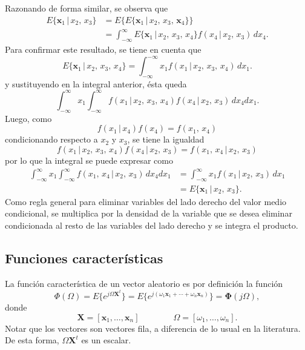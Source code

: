 \documentclass[a4paper]{report}
\newcommand{\X}{\mathbf{X}}
\newcommand{\x}{\mathbf{x}}
\newcommand{\Phibf}{\mathbf{\Phi}}
\begin{document}
Razonando de forma similar, se observa que
\begin{align*}
 E\{\x_1\,|\,x_2,\,x_3\}&=E\{E\{\x_1\,|\,x_2,\,x_3,\,\x_4\}\}\\
   &=\int_{-\infty}^{\infty}E\{\x_1\,|\,x_2,\,x_3,\,x_4\}f(x_4\,|\,x_2,\,x_3)\,dx_4.
\end{align*}
Para confirmar este resultado, se tiene en cuenta que
\[
 E\{\x_1\,|\,x_2,\,x_3,\,x_4\}=\int_{-\infty}^{-\infty}x_1f(x_1\,|\,x_2,\,x_3,\,x_4)\,dx_1.
\]
y sustituyendo en la integral anterior, ésta queda
\[
 \int_{-\infty}^{\infty}x_1\int_{-\infty}^{\infty}f(x_1\,|\,x_2,\,x_3,\,x_4)f(x_4\,|\,x_2,\,x_3)\,dx_4dx_1.
\]
Luego, como
\[
 f(x_1\,|\,x_4)f(x_4)=f(x_1,\,x_4)
\]
condicionando respecto a \(x_2\) y \(x_3\), se tiene la igualdad
\[
 f(x_1\,|\,x_2,\,x_3,\,x_4)f(x_4\,|\,x_2,\,x_3)=f(x_1,\,x_4\,|\,x_2,\,x_3)
\]
por lo que la integral se puede expresar como
\begin{align*}
 \int_{-\infty}^{\infty}x_1\int_{-\infty}^{\infty}f(x_1,\,x_4\,|\,x_2,\,x_3)\,dx_4dx_1&=\int_{-\infty}^{\infty}x_1f(x_1\,|\,x_2,\,x_3)\,dx_1\\
   &=E\{\x_1\,|\,x_2,\,x_3\}.
\end{align*}
Como regla general para eliminar variables del lado derecho del valor medio condicional, se multiplica por la densidad de la variable que se desea eliminar condicionada al resto de las variables del lado derecho y se integra el producto.

\subsection{Funciones características}

La función característica de un vector aleatorio es por definición la función
\[
 \Phi(\Omega)=E\{e^{j\Omega\X^t}\}=E\{e^{j(\omega_1\x_1+\cdots+\omega_n\x_n)}\}=\Phibf(j\Omega),
\]
donde
\[
 \X=[\x_1,\dots,\x_n]\qquad\qquad \Omega=[\omega_1,\dots,\omega_n].
\]
Notar que los vectores son vectores fila, a diferencia de lo usual en la literatura. De esta forma, \(\Omega\X^t\) es un escalar.
\end{document}
